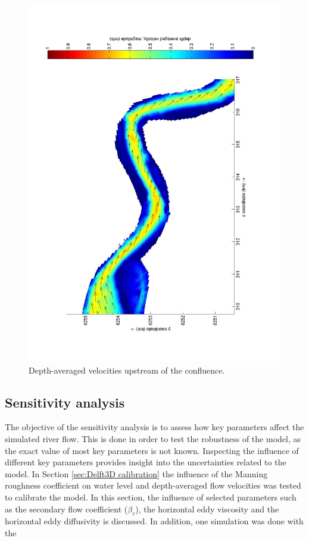 \begin{figure}[H]
    \centering
    \includegraphics[width=0.8\linewidth, angle=270]{figures/ch7/dav_upstream_bends.jpg}
    \caption{Depth-averaged velocities upstream of the confluence.}
    \label{fig:dav bends}
\end{figure}

\subsection{Sensitivity analysis}
\label{Sensitivity analysis}
The objective of the sensitivity analysis is to assess how key parameters affect the simulated river flow. This is done in order to test the robustness of the model, as the exact value of most key parameters is not known. Inspecting the influence of different key parameters provides insight into the uncertainties related to the model. In Section \ref{sec:Delft3D calibration} the influence of the Manning roughness coefficient on water level and depth-averaged flow velocities was tested to calibrate the model. In this section, the influence of selected parameters such as the secondary flow coefficient ($\beta_c$), the horizontal eddy viscosity and the horizontal eddy diffusivity is discussed. In addition, one simulation was done with the 
